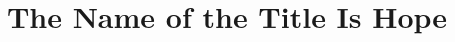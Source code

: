 \documentclass[sigconf]{acmart} %
\begin{document}

\title{The Name of the Title Is Hope} %











\renewcommand{\shortauthors}{Trovato et al.}
\end{document}
